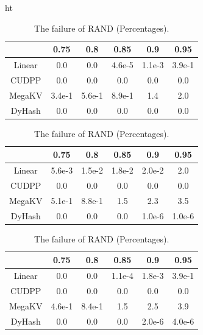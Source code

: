 \begin{table}{ht}\centering
	\begin{minipage}{0.45\linewidth}\centering
		\caption{The failure of TW (Percentages).}
		\begin{tabular}{|c|c|c|c|c|c|}
			\hline
			& 0.75 & 0.8 & 0.85 & 0.9 & 0.95\\ \hline
			Linear &0.0 & 0.0 &4.6e-5  & 1.1e-3 & 3.9e-1 \\ \hline
			CUDPP & 0.0 & 0.0 &0.0  & 0.0 & 0.0 \\ \hline
			MegaKV & 3.4e-1 & 5.6e-1 &8.9e-1 & 1.4 & 2.0 \\ \hline
			DyHash &0.0 & 0.0 &0.0  & 0.0 & 0.0 \\ \hline
		\end{tabular}
		\label{tab:fail:tw}
	\end{minipage}
	\begin{minipage}{0.45\linewidth}\centering
		\caption{The failure of RE (Percentages).}
		\begin{tabular}{|c|c|c|c|c|c|}
			\hline
			& 0.75 & 0.8 & 0.85 & 0.9 & 0.95\\ \hline
			Linear &5.6e-3 & 1.5e-2 &1.8e-2  & 2.0e-2 & 2.0 \\ \hline
			CUDPP & 0.0 & 0.0 &0.0  & 0.0 & 0.0 \\ \hline
			MegaKV &5.1e-1 & 8.8e-1 &1.5  & 2.3 & 3.5 \\ \hline
			DyHash &0.0 & 0.0 &0.0  & 1.0e-6 & 1.0e-6 \\ \hline
		\end{tabular}
		\label{tab:fail:re}
	\end{minipage}
	\begin{minipage}{0.45\linewidth}\centering
		\caption{The failure of LINE (Percentages).}
		\begin{tabular}{|c|c|c|c|c|c|}
			\hline
			& 0.75 & 0.8 & 0.85 & 0.9 & 0.95\\ \hline
			Linear &0.0 & 0.0 &1.1e-4  & 1.8e-3 & 3.9e-1 \\ \hline
			CUDPP & 0.0 & 0.0 &0.0  & 0.0 & 0.0 \\ \hline
			MegaKV &4.6e-1 & 8.4e-1 &1.5  & 2.5 & 3.9 \\ \hline
			DyHash &0.0 & 0.0 &0.0  & 2.0e-6 & 4.0e-6 \\ \hline
		\end{tabular}
		\label{tab:fail:line}
	\end{minipage}
	\begin{minipage}{0.45\linewidth}\centering
		\caption{The failure of RAND (Percentages).}

\end{minipage}
\end{table}

